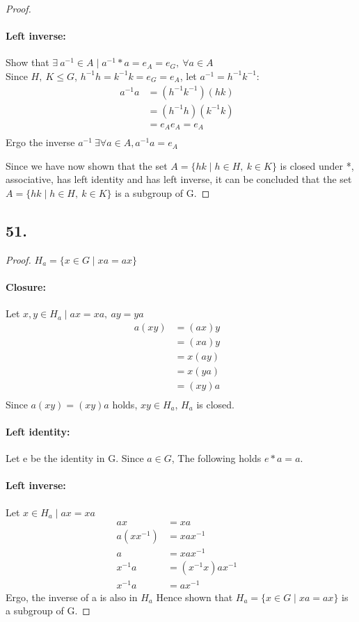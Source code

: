 \documentclass{article}
\begin{document}
\begin{proof}
	\paragraph{Left inverse: }Show that $\exists\ a^{-1} \in A 
		\mid a^{-1}*a = e_A=e_G,\ \forall a \in A$ \\
		Since $H,\ K \leq G$, $h^{-1}h = k^{-1}k = e_G=e_A$, let $a^{-1} =
		h^{-1}k^{-1}$:
		\begin{align*}
			a^{-1}a &= (h^{-1}k^{-1})(hk)&\\
							&= (h^{-1}h)(k^{-1}k)&\\
							&= e_Ae_A=e_A&\\
		\end{align*}
		Ergo the inverse $a^{-1}\ \exists \forall a \in A, a^{-1}a=e_A$
		\par Since we have now shown that the set $A = \{hk\mid h\in H,\ k\in K\}$
		is closed under *, associative, has left identity and has left inverse, it
		can be concluded that the set $A = \{hk\mid h\in H,\ k\in K\}$ is a subgroup
		of G.
\end{proof}

\subsection*{51. }
\begin{proof}$H_a = \{x \in G \mid xa=ax\}$
	\paragraph{Closure: }Let $x,y \in H_a \mid ax=xa,\ ay=ya$
	\begin{align*}
		a(xy) &= (ax)y&\\
		      &= (xa)y&\\
		      &= x(ay)&\\
		      &= x(ya)&\\
		      &= (xy)a&\\
	\end{align*}
	Since $a(xy)=(xy)a$ holds, $xy \in H_a$, $H_a$ is closed.

	\paragraph{Left identity: }Let e be the identity in G. Since $a \in G$, The
	following holds $e*a = a$.

	\paragraph{Left inverse: }Let $x \in H_a \mid ax=xa$
	\begin{align*}
		ax&=xa&\\
		a(xx^{-1})&=xax^{-1}&\\
		a&=xax^{-1}&\\
		x^{-1}a&=(x^{-1}x)ax^{-1}&\\
		x^{-1}a&=ax^{-1}&
	\end{align*}
	Ergo, the inverse of a is also in $H_a$
	Hence shown that $H_a = \{x \in G \mid xa=ax\}$ is a subgroup of G.
\end{proof}
\end{document}
